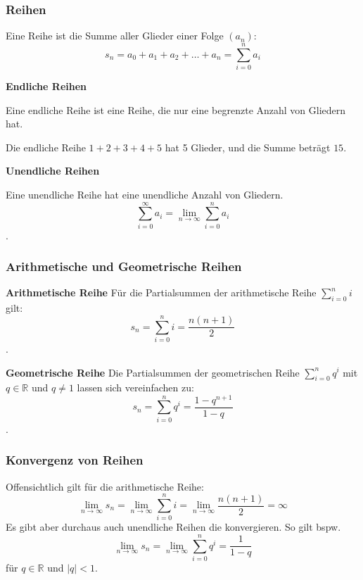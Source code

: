 \documentclass{beamer}
\begin{document}
  \begin{frame}
    \frametitle{Reihen}
    
    Eine Reihe ist die Summe aller Glieder einer Folge $(a_n)$:
    $$s_n = a_0 + a_1 + a_2 + \ldots + a_n = \sum_{i=0}^{n} a_i$$
  
    \vspace{0.5em}
  
    \textbf{Endliche Reihen}
  
    Eine endliche Reihe ist eine Reihe, die nur eine begrenzte Anzahl von Gliedern hat. 
  
    Die endliche Reihe $1 + 2 + 3 + 4 + 5$ hat 5 Glieder, und die Summe beträgt $15$.
  
    \vspace{0.5em}
  
    \textbf{Unendliche Reihen}
  
    Eine unendliche Reihe hat eine unendliche Anzahl von Gliedern. 
    $$\sum_{i=0}^{\infty} a_i = \lim_{n \to \infty} \sum_{i=0}^{n} a_i$$.
\end{frame}

\begin{frame}
  \frametitle{Arithmetische und Geometrische Reihen}
    \textbf{Arithmetische Reihe}
    Für die Partialsummen der arithmetische Reihe $\sum_{i=0}^{n} i $ gilt:
    $$ s_n = \sum_{i=0}^{n} i = \frac{n(n+1)}{2}$$.

    \textbf{Geometrische Reihe}
    Die Partialsummen der geometrischen Reihe $\sum_{i=0}^{n} q^i $ mit $q \in\mathbb{R}$ und $q \neq 1$ lassen sich vereinfachen zu:
    $$ s_n = \sum_{i=0}^{n} q^i = \frac{1-q^{n+1}}{1 - q }$$.

\end{frame}

\begin{frame}
  \frametitle{Konvergenz von Reihen}
  Offensichtlich gilt für die arithmetische Reihe:
  $$ \lim_{n \to \infty} s_n = \lim_{n \to \infty}  \sum_{i=0}^{n} i = \lim_{n \to \infty}  \frac{n(n+1)}{2} =\infty$$
  Es gibt aber durchaus auch unendliche Reihen die konvergieren. So gilt bspw.
  $$\lim_{n \to \infty}  s_n =\lim_{n \to \infty}  \sum_{i=0}^{n} q^i = \frac{1}{1 - q }$$
  für $q \in \mathbb{R}$ und $\vert q\vert   < 1$.
  \end{frame}
  
\end{document}
